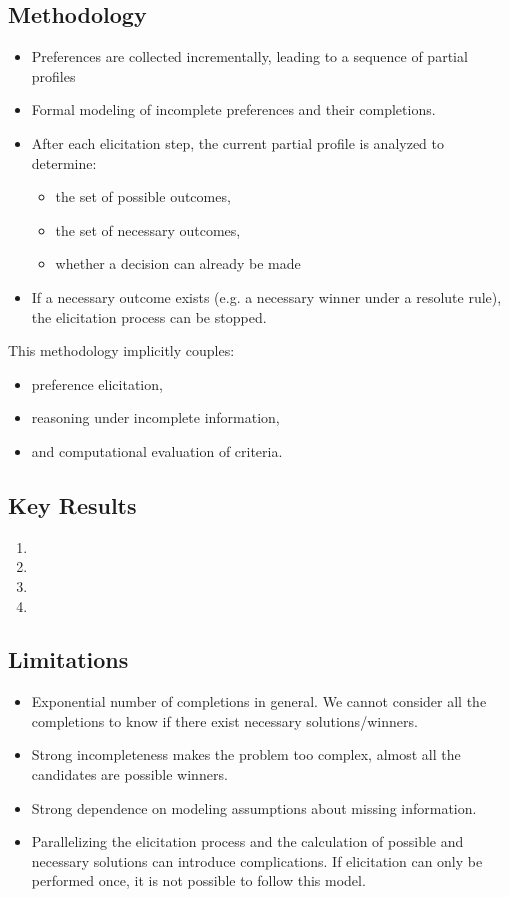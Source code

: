 \documentclass[12pt,a4paper]{article}
\begin{document}
\subsection*{Methodology}
\begin{itemize}
    \item Preferences are collected incrementally, leading to a sequence of partial profiles
    \item Formal modeling of incomplete preferences and their completions.
    \item After each elicitation step, the current partial profile is analyzed to determine:
    \begin{itemize}
        \item the set of possible outcomes,
        \item the set of necessary outcomes,
        \item whether a decision can already be made
    \end{itemize}
    \item If a necessary outcome exists (e.g. a necessary winner under a resolute rule),
    the elicitation process can be stopped.
\end{itemize}
This methodology implicitly couples:
\begin{itemize}
    \item preference elicitation,
    \item reasoning under incomplete information,
    \item and computational evaluation of criteria.
\end{itemize}

\subsection*{Key Results}
\begin{enumerate}
    \item 
    \item 
    \item
    \item 
\end{enumerate}

\subsection*{Limitations}
\begin{itemize}
    \item Exponential number of completions in general. We cannot consider all the completions to know if there exist necessary solutions/winners.
    \item Strong incompleteness makes the problem too complex, almost all the candidates are possible winners.
    \item Strong dependence on modeling assumptions about missing information.
    \item Parallelizing the elicitation process and the calculation of possible and necessary solutions can introduce complications. If elicitation can only be performed once, it is not possible to follow this model.
\end{itemize}
\end{document}

